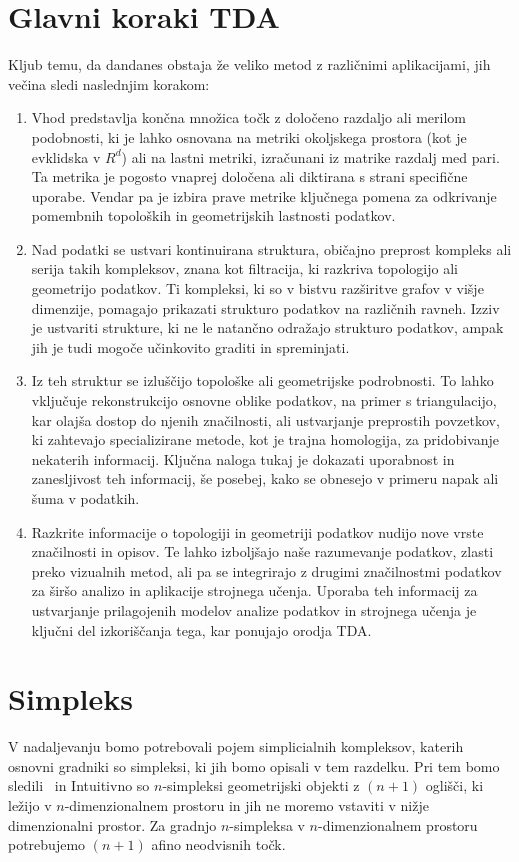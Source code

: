 \section{Glavni koraki TDA}
Kljub temu, da dandanes obstaja že veliko metod z različnimi aplikacijami, jih večina sledi naslednjim korakom:
\begin{enumerate}
    \item Vhod predstavlja končna množica točk z določeno razdaljo ali merilom podobnosti, ki je lahko osnovana na metriki okoljskega prostora (kot je evklidska v $R^d$) ali na lastni metriki, izračunani iz matrike razdalj med pari. Ta metrika je pogosto vnaprej določena ali diktirana s strani specifične uporabe. Vendar pa je izbira prave metrike ključnega pomena za odkrivanje pomembnih topoloških in geometrijskih lastnosti podatkov.
    \item Nad podatki se ustvari kontinuirana struktura, običajno preprost kompleks ali serija takih kompleksov, znana kot filtracija, ki razkriva topologijo ali geometrijo podatkov. Ti kompleksi, ki so v bistvu razširitve grafov v višje dimenzije, pomagajo prikazati strukturo podatkov na različnih ravneh. Izziv je ustvariti strukture, ki ne le natančno odražajo strukturo podatkov, ampak jih je tudi mogoče učinkovito graditi in spreminjati.
    \item Iz teh struktur se izluščijo topološke ali geometrijske podrobnosti. To lahko vključuje rekonstrukcijo osnovne oblike podatkov, na primer s triangulacijo, kar olajša dostop do njenih značilnosti, ali ustvarjanje preprostih povzetkov, ki zahtevajo specializirane metode, kot je trajna homologija, za pridobivanje nekaterih informacij. Ključna naloga tukaj je dokazati uporabnost in zanesljivost teh informacij, še posebej, kako se obnesejo v primeru napak ali šuma v podatkih.
    \item Razkrite informacije o topologiji in geometriji podatkov nudijo nove vrste značilnosti in opisov. Te lahko izboljšajo naše razumevanje podatkov, zlasti preko vizualnih metod, ali pa se integrirajo z drugimi značilnostmi podatkov za širšo analizo in aplikacije strojnega učenja. Uporaba teh informacij za ustvarjanje prilagojenih modelov analize podatkov in strojnega učenja je ključni del izkoriščanja tega, kar ponujajo orodja TDA.\@
\end{enumerate}

\section{Simpleks}
V nadaljevanju bomo potrebovali pojem simplicialnih kompleksov, katerih osnovni gradniki so simpleksi, ki jih bomo opisali v tem razdelku. Pri tem bomo sledili~\cite{Urbančič_2020} in  Intuitivno so $n$-simpleksi geometrijski objekti z $(n + 1)$ oglišči, ki ležijo v $n$-dimenzionalnem prostoru in jih ne moremo vstaviti v nižje dimenzionalni prostor. Za gradnjo $n$-simpleksa v $n$-dimenzionalnem prostoru potrebujemo $(n + 1)$ afino neodvisnih točk.

